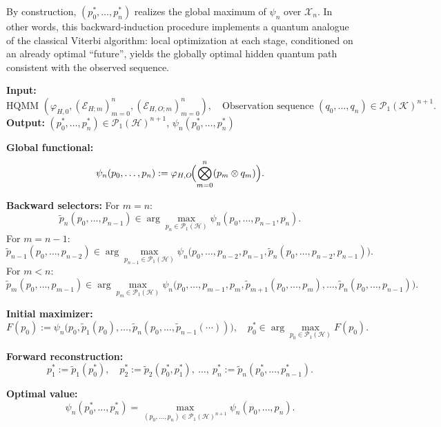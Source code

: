 \documentclass[12pt, reco]{article}
\begin{document}
By construction, \((p_0^*,\dots,p_n^*)\) realizes the global maximum of
\(\psi_n\) over \(\mathcal{X}_n\). In other words, this backward-induction
procedure implements a quantum analogue of the classical Viterbi algorithm:
local optimization at each stage, conditioned on an already optimal “future”,
yields the globally optimal hidden quantum path consistent with the observed
sequence.
\begin{algorithm}[H]
\caption{Quantum Viterbi via Backward Selectors}
\begin{algorithmic}[1]
\State \textbf{Input:}
\[
\text{HQMM } 
(\varphi_{H,0},(\mathcal{E}_{H;m})_{m=0}^n,(\mathcal{E}_{H,O;m})_{m=0}^n),
\quad
\text{Observation sequence } (q_0,\dots,q_n)\in\mathcal{P}_1(\mathcal{K})^{n+1}.
\]
\State \textbf{Output:} $(p_0^*,\dots,p_n^*)\in\mathcal{P}_1(\mathcal{H})^{n+1}$, $\psi_n(p_0^*,\dots,p_n^*)$
\State

\State \textbf{Global functional:}
\[
\psi_n(p_0,\dots,p_n)
:= \varphi_{H,O}\!\Bigl(\bigotimes_{m=0}^n (p_m \otimes q_m)\Bigr).
\]

\State \textbf{Backward selectors:}
\State For $m=n$:
\[
\widetilde{p}_n(p_0,\dots,p_{n-1})
\in \arg\max_{p_n\in\mathcal{P}_1(\mathcal{H})}
      \psi_n(p_0,\dots,p_{n-1},p_n).
\]
\State For $m=n-1$:
\[
\widetilde{p}_{n-1}(p_0,\dots,p_{n-2})
\in \arg\max_{p_{n-1}\in\mathcal{P}_1(\mathcal{H})}
      \psi_n\bigl(p_0,\dots,p_{n-2},p_{n-1},
                  \widetilde{p}_n(p_0,\dots,p_{n-2},p_{n-1})\bigr).
\]
\State For $m<n$:
\[
\widetilde{p}_m(p_0,\dots,p_{m-1})
\in \arg\max_{p_m\in\mathcal{P}_1(\mathcal{H})}
      \psi_n\bigl(p_0,\dots,p_{m-1},p_m,
                  \widetilde{p}_{m+1}(p_0,\dots,p_m),
                  \dots,
                  \widetilde{p}_n(p_0,\dots,p_{n-1})\bigr).
\]

\State \textbf{Initial maximizer:}
\[
F(p_0)
:= \psi_n\bigl(p_0,
               \widetilde{p}_1(p_0),
               \dots,
               \widetilde{p}_n(p_0,\dots,\widetilde{p}_{n-1}(\cdots))\bigr),
\quad
p_0^* \in \arg\max_{p_0\in\mathcal{P}_1(\mathcal{H})} F(p_0).
\]

\State \textbf{Forward reconstruction:}
\[
p_1^* := \widetilde{p}_1(p_0^*),\quad
p_2^* := \widetilde{p}_2(p_0^*,p_1^*),\ \dots,\ 
p_n^* := \widetilde{p}_n(p_0^*,\dots,p_{n-1}^*).
\]

\State \textbf{Optimal value:}
\[
\psi_n(p_0^*,\dots,p_n^*)
= \max_{(p_0,\dots,p_n)\in\mathcal{P}_1(\mathcal{H})^{n+1}} \psi_n(p_0,\dots,p_n).
\]

\end{algorithmic}
\end{algorithm}
 
\end{document}
